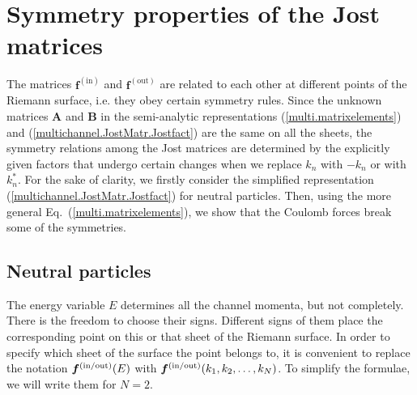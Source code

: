 \documentclass[12pt]{article}
\begin{document}
\section{Symmetry properties of the Jost matrices}
\label{Appendix_symmetry}
The matrices $\bm{f}^{\mathrm{(in)}}$ and $\bm{f}^{\mathrm{(out)}}$ are related
to each other at different points of the Riemann surface, i.e. they obey certain
symmetry rules. Since the unknown matrices $\bm{A}$ and $\bm{B}$ in the
semi-analytic representations
(\ref{multi.matrixelements}) and (\ref{multichannel.JostMatr.Jostfact}) are the
same on all the sheets, the symmetry relations among the Jost matrices are
determined by the explicitly given factors that undergo certain changes when we
replace $k_n$ with $-k_n$ or with $k_n^*$. For the sake of clarity, we firstly
consider the simplified representation (\ref{multichannel.JostMatr.Jostfact})
for neutral particles. Then, using the more general
Eq.~(\ref{multi.matrixelements}), we show that the Coulomb forces break some of
the symmetries.

\subsection{Neutral particles}
\label{Appendix.neutral}
The energy variable $E$ determines all the channel momenta, but not completely.
There is the freedom to choose their signs. Different signs of them place the
corresponding point on this or that sheet of the Riemann surface. In order to
specify which sheet of the surface the point belongs to, it is convenient to
replace the notation $\bm{f}^{\rm(in/out)}(E)$ with
$\bm{f}^{\rm(in/out)}(k_1,k_2,\dots,k_N)$. To simplify the formulae, we will
write them for $N=2$.
\end{document}
